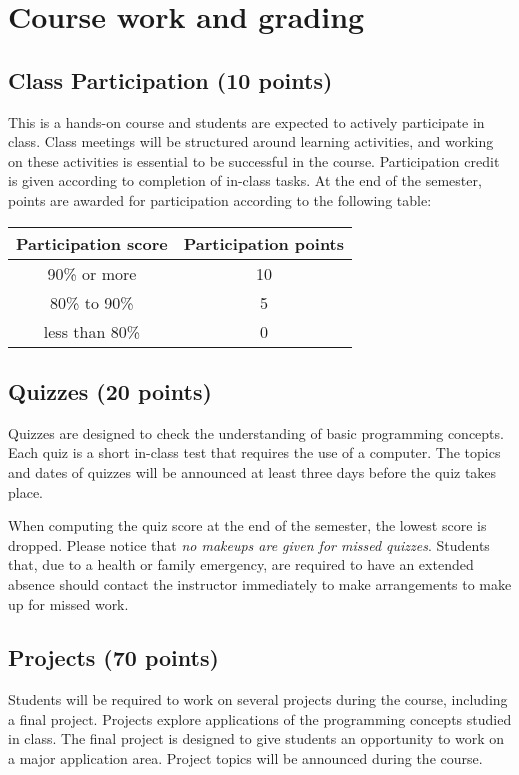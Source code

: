 \documentclass[12pt]{article}
\begin{document}
\section{Course work and grading}

\subsection{Class Participation (10 points)} 
This is a hands-on course and students are expected to actively participate in class. Class meetings will be structured around learning activities, and working on these activities is essential to be successful in the course. Participation credit is given according to completion of in-class tasks. At the end of the semester, points are awarded for participation according to the following table:

\begin{center}
\begin{tabular}{|c|c|}\hline
\textbf{Participation score} & \textbf{Participation points}\\\hline\hline
90\% or more & 10\\\hline
80\% to 90\% & 5\\\hline
less than 80\% & 0\\\hline
\end{tabular}
\end{center}

\subsection{Quizzes (20 points)}
Quizzes are designed to check the understanding of basic programming concepts. Each quiz is a short in-class test that requires the use of a computer. The topics and dates of quizzes will be announced at least three days before the quiz takes place.

When computing the quiz score at the end of the semester, the lowest score is dropped. Please notice that \emph{no makeups are given for missed quizzes}. Students that, due to a health or family emergency, are required to have an extended absence should contact the instructor immediately to make arrangements to make up for missed work.


\subsection{Projects (70 points)}

Students will be required to work on several projects during the course, including a final project. Projects explore applications of the programming concepts studied in class. The final project is designed to give students an opportunity to work on a major application area. Project topics will be announced during the course.
\end{document}
